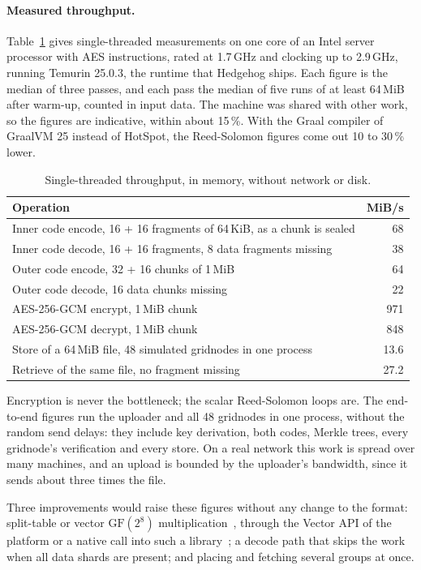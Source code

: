 \documentclass[10pt,a4paper,final]{article}
\begin{document}
\paragraph{Measured throughput.} Table~\ref{tab:throughput} gives single-threaded measurements on one core of an
Intel server processor with AES instructions, rated at 1.7\,GHz and clocking up to 2.9\,GHz, running Temurin 25.0.3,
the runtime that Hedgehog ships. Each figure is the median of three passes, and each pass the median of five runs
of at least 64\,MiB after warm-up, counted in input data. The machine was shared with other work, so the figures are
indicative, within about 15\,\%. With the Graal compiler of GraalVM 25 instead of HotSpot, the Reed-Solomon figures
come out 10 to 30\,\% lower.

\begin{table}[H]
\centering
\small
\begin{tabular}{@{}lr@{}}
\toprule
Operation & MiB/s \\
\midrule
Inner code encode, 16 + 16 fragments of 64\,KiB, as a chunk is sealed & 68 \\
Inner code decode, 16 + 16 fragments, 8 data fragments missing & 38 \\
Outer code encode, 32 + 16 chunks of 1\,MiB & 64 \\
Outer code decode, 16 data chunks missing & 22 \\
AES-256-GCM encrypt, 1\,MiB chunk & 971 \\
AES-256-GCM decrypt, 1\,MiB chunk & 848 \\
Store of a 64\,MiB file, 48 simulated gridnodes in one process & 13.6 \\
Retrieve of the same file, no fragment missing & 27.2 \\
\bottomrule
\end{tabular}
\caption{Single-threaded throughput, in memory, without network or disk.}
\label{tab:throughput}
\end{table}

Encryption is never the bottleneck; the scalar Reed-Solomon loops are. The end-to-end figures run the uploader and
all 48 gridnodes in one process, without the random send delays: they include key derivation, both codes, Merkle
trees, every gridnode's verification and every store. On a real network this work is spread over many machines, and
an upload is bounded by the uploader's bandwidth, since it sends about three times the file.

Three improvements would raise these figures without any change to the format: split-table or vector
$\mathrm{GF}(2^8)$ multiplication~\cite{plank2013,isal}, through the Vector API of the platform or a native call
into such a library~\cite{jep508,jep454}; a decode path that skips the work when all data shards are present; and
placing and fetching several groups at once.
\end{document}
